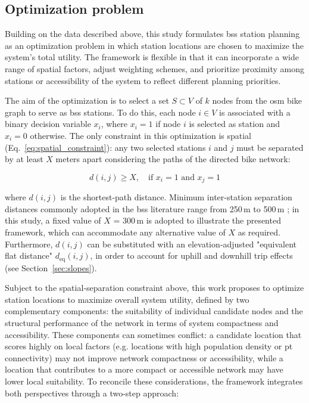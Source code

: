     \subsection{Optimization problem}
    
    Building on the data described above, this study formulates \ac{bss} station planning as an optimization problem in which station locations are chosen to maximize the system's total utility. The framework is flexible in that it can incorporate a wide range of spatial factors, adjust weighting schemes, and prioritize proximity among stations or accessibility of the system to reflect different planning priorities.

    The aim of the optimization is to select a set $ S \subset V $ of $ k $ nodes from the \ac{osm} bike graph to serve as \ac{bss} stations. To do this, each node $i \in V$ is associated with a binary decision variable $x_i$, where $x_i = 1$ if node $i$ is selected as station and $x_i = 0$ otherwise. The only constraint in this optimization is spatial (Eq.~\ref{eq:spatial_constraint}): any two selected stations $ i $ and $ j $ must be separated by at least $X$ meters apart considering the paths of the directed bike network: 

        \begin{equation}\label{eq:spatial_constraint}
            d(i,j) \geq X, \quad \text{if } x_i = 1 \text{ and } x_j = 1
        \end{equation}

    where $ d(i,j) $ is the shortest‐path distance. Minimum inter-station separation distances commonly adopted in the \ac{bss} literature range from 250\,m to 500\,m \cite{Kabak2018, MateoBabiano2016, Croci2014}; in this study, a fixed value of  $X$ = 300\,m is adopted to illustrate the presented framework, which can accommodate any alternative value of \(X\) as required. Furthermore, \(d(i,j)\) can be substituted with an elevation‐adjusted "equivalent flat distance"  $d_{\mathrm{eq}}(i,j)$, in order to account for uphill and downhill trip effects (see Section~\ref{sec:slopes}). 

    Subject to the spatial‐separation constraint above, this work proposes to optimize station locations to maximize overall system utility, defined by two complementary components: the suitability of individual candidate nodes and the structural performance of the network in terms of system compactness and accessibility. These components can sometimes conflict: a candidate location that scores highly on local factors (e.g. locations with high population density or \ac{pt} connectivity) may not improve network compactness or accessibility, while a location that contributes to a more compact or accessible network may have lower local suitability. To reconcile these considerations, the framework integrates both perspectives through a two-step approach:


